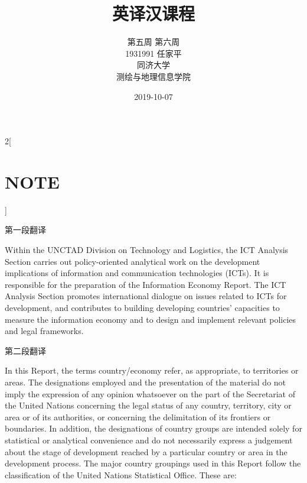 \documentclass[a4paper, UTF8, 12pt]{article}
\begin{document}
\title{\Huge 英译汉课程}
\author{\Large 
        第五周 第六周 \\[12pt]
        1931991 任家平 \\[12pt]
        同济大学 \\[12pt]
        测绘与地理信息学院}
\date{2019-10-07}

\maketitle
\thispagestyle{empty}

\newpage
{}
\tableofcontents
{}

\newpage
{}

\begin{paracol}{2}[\section{NOTE}]
    
    \switchcolumn*
    第一段翻译

    \switchcolumn
    Within the UNCTAD Division on Technology and Logistics, the ICT Analysis Section carries out policy-oriented analytical work on the development implications of information and communication technologies (ICTs). It is responsible for the preparation of the Information Economy Report. The ICT Analysis Section promotes international dialogue on issues related to ICTs for development, and contributes to building developing countries’ capacities to measure the information economy and to design and implement relevant policies and legal frameworks. 

    \switchcolumn*
    第二段翻译

    \switchcolumn
    In this Report, the terms country/economy refer, as appropriate, to territories or areas. The designations employed and the presentation of the material do not imply the expression of any opinion whatsoever on the part of the Secretariat of the United Nations concerning the legal status of any country, territory, city or area or of its authorities, or concerning the delimitation of its frontiers or boundaries. In addition, the designations of country groups are intended solely for statistical or analytical convenience and do not necessarily express a judgement about the stage of development reached by a particular country or area in the development process. The major country groupings used in this Report follow the classification of the United Nations Statistical Office. These are: 


\end{paracol}
\end{document}

